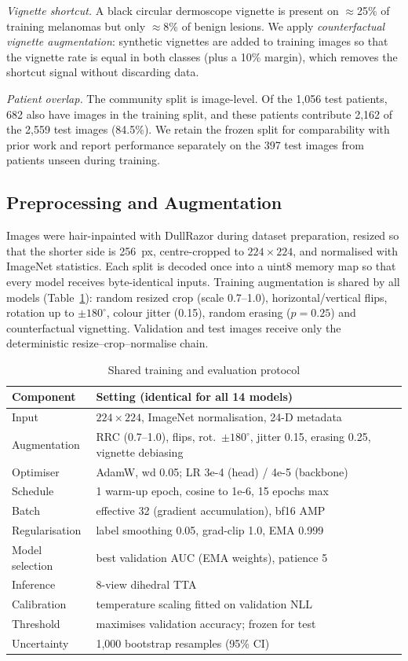\documentclass[journal]{IEEEtran}
\begin{document}
\textit{Vignette shortcut.} A black circular dermoscope vignette is present on $\approx$25\% of training melanomas but only $\approx$8\% of benign lesions. We apply \emph{counterfactual vignette augmentation}: synthetic vignettes are added to training images so that the vignette rate is equal in both classes (plus a 10\% margin), which removes the shortcut signal without discarding data.

\textit{Patient overlap.} The community split is image-level. Of the 1,056 test patients, 682 also have images in the training split, and these patients contribute 2,162 of the 2,559 test images (84.5\%). We retain the frozen split for comparability with prior work and report performance separately on the 397 test images from patients unseen during training.

\subsection{Preprocessing and Augmentation}
Images were hair-inpainted with DullRazor during dataset preparation, resized so that the shorter side is 256~px, centre-cropped to $224\times224$, and normalised with ImageNet statistics. Each split is decoded once into a uint8 memory map so that every model receives byte-identical inputs. Training augmentation is shared by all models (Table~\ref{tab:protocol}): random resized crop (scale 0.7--1.0), horizontal/vertical flips, rotation up to $\pm180^\circ$, colour jitter (0.15), random erasing ($p=0.25$) and counterfactual vignetting. Validation and test images receive only the deterministic resize--crop--normalise chain.

\begin{table}[!t]
\centering
\caption{Shared training and evaluation protocol}
\label{tab:protocol}
\scriptsize
\begin{tabular}{p{2.4cm}p{5.4cm}}
\toprule
Component & Setting (identical for all 14 models)\\
\midrule
Input & $224\times224$, ImageNet normalisation, 24-D metadata\\
Augmentation & RRC (0.7--1.0), flips, rot.\ $\pm180^\circ$, jitter 0.15, erasing 0.25, vignette debiasing\\
Optimiser & AdamW, wd 0.05; LR 3e-4 (head) / 4e-5 (backbone)\\
Schedule & 1 warm-up epoch, cosine to 1e-6, 15 epochs max\\
Batch & effective 32 (gradient accumulation), bf16 AMP\\
Regularisation & label smoothing 0.05, grad-clip 1.0, EMA 0.999\\
Model selection & best validation AUC (EMA weights), patience 5\\
Inference & 8-view dihedral TTA\\
Calibration & temperature scaling \cite{guo2017} fitted on validation NLL\\
Threshold & maximises validation accuracy; frozen for test\\
Uncertainty & 1,000 bootstrap resamples (95\% CI)\\
\bottomrule
\end{tabular}
\end{table}
\end{document}
